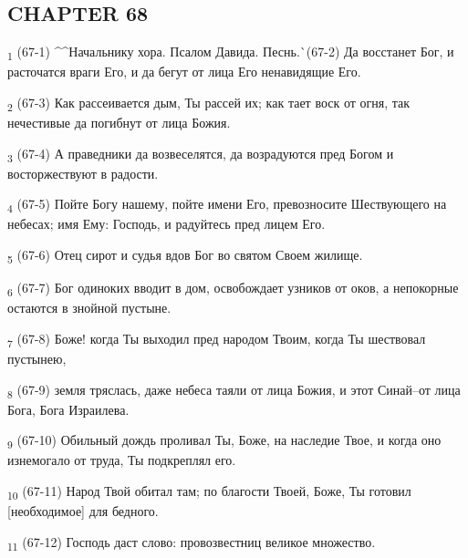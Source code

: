 \subsection{CHAPTER 68}
\begin{tcolorbox}
\textsubscript{1} (67-1) ^^Начальнику хора. Псалом Давида. Песнь.^^ (67-2) Да восстанет Бог, и расточатся враги Его, и да бегут от лица Его ненавидящие Его.
\end{tcolorbox}
\begin{tcolorbox}
\textsubscript{2} (67-3) Как рассеивается дым, Ты рассей их; как тает воск от огня, так нечестивые да погибнут от лица Божия.
\end{tcolorbox}
\begin{tcolorbox}
\textsubscript{3} (67-4) А праведники да возвеселятся, да возрадуются пред Богом и восторжествуют в радости.
\end{tcolorbox}
\begin{tcolorbox}
\textsubscript{4} (67-5) Пойте Богу нашему, пойте имени Его, превозносите Шествующего на небесах; имя Ему: Господь, и радуйтесь пред лицем Его.
\end{tcolorbox}
\begin{tcolorbox}
\textsubscript{5} (67-6) Отец сирот и судья вдов Бог во святом Своем жилище.
\end{tcolorbox}
\begin{tcolorbox}
\textsubscript{6} (67-7) Бог одиноких вводит в дом, освобождает узников от оков, а непокорные остаются в знойной пустыне.
\end{tcolorbox}
\begin{tcolorbox}
\textsubscript{7} (67-8) Боже! когда Ты выходил пред народом Твоим, когда Ты шествовал пустынею,
\end{tcolorbox}
\begin{tcolorbox}
\textsubscript{8} (67-9) земля тряслась, даже небеса таяли от лица Божия, и этот Синай--от лица Бога, Бога Израилева.
\end{tcolorbox}
\begin{tcolorbox}
\textsubscript{9} (67-10) Обильный дождь проливал Ты, Боже, на наследие Твое, и когда оно изнемогало от труда, Ты подкреплял его.
\end{tcolorbox}
\begin{tcolorbox}
\textsubscript{10} (67-11) Народ Твой обитал там; по благости Твоей, Боже, Ты готовил [необходимое] для бедного.
\end{tcolorbox}
\begin{tcolorbox}
\textsubscript{11} (67-12) Господь даст слово: провозвестниц великое множество.
\end{tcolorbox}
